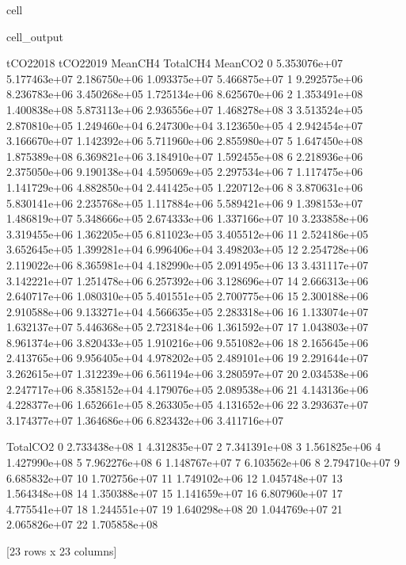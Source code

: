 \documentclass[letterpaper,10pt,english]{jupyterBook}
\begin{document}
\begin{sphinxuseclass}{cell}
\begin{sphinxVerbatimOutput}
\begin{sphinxuseclass}{cell_output}
\begin{sphinxVerbatim}[commandchars=\\\{\}]
       tCO2\PYGZus{}2018     tCO2\PYGZus{}2019      Mean\PYGZus{}CH4     Total\PYGZus{}CH4      Mean\PYGZus{}CO2  \PYGZbs{}
0   5.353076e+07  5.177463e+07  2.186750e+06  1.093375e+07  5.466875e+07   
1   9.292575e+06  8.236783e+06  3.450268e+05  1.725134e+06  8.625670e+06   
2   1.353491e+08  1.400838e+08  5.873113e+06  2.936556e+07  1.468278e+08   
3   3.513524e+05  2.870810e+05  1.249460e+04  6.247300e+04  3.123650e+05   
4   2.942454e+07  3.166670e+07  1.142392e+06  5.711960e+06  2.855980e+07   
5   1.647450e+08  1.875389e+08  6.369821e+06  3.184910e+07  1.592455e+08   
6   2.218936e+06  2.375050e+06  9.190138e+04  4.595069e+05  2.297534e+06   
7   1.117475e+06  1.141729e+06  4.882850e+04  2.441425e+05  1.220712e+06   
8   3.870631e+06  5.830141e+06  2.235768e+05  1.117884e+06  5.589421e+06   
9   1.398153e+07  1.486819e+07  5.348666e+05  2.674333e+06  1.337166e+07   
10  3.233858e+06  3.319455e+06  1.362205e+05  6.811023e+05  3.405512e+06   
11  2.524186e+05  3.652645e+05  1.399281e+04  6.996406e+04  3.498203e+05   
12  2.254728e+06  2.119022e+06  8.365981e+04  4.182990e+05  2.091495e+06   
13  3.431117e+07  3.142221e+07  1.251478e+06  6.257392e+06  3.128696e+07   
14  2.666313e+06  2.640717e+06  1.080310e+05  5.401551e+05  2.700775e+06   
15  2.300188e+06  2.910588e+06  9.133271e+04  4.566635e+05  2.283318e+06   
16  1.133074e+07  1.632137e+07  5.446368e+05  2.723184e+06  1.361592e+07   
17  1.043803e+07  8.961374e+06  3.820433e+05  1.910216e+06  9.551082e+06   
18  2.165645e+06  2.413765e+06  9.956405e+04  4.978202e+05  2.489101e+06   
19  2.291644e+07  3.262615e+07  1.312239e+06  6.561194e+06  3.280597e+07   
20  2.034538e+06  2.247717e+06  8.358152e+04  4.179076e+05  2.089538e+06   
21  4.143136e+06  4.228377e+06  1.652661e+05  8.263305e+05  4.131652e+06   
22  3.293637e+07  3.174377e+07  1.364686e+06  6.823432e+06  3.411716e+07   

       Total\PYGZus{}CO2  
0   2.733438e+08  
1   4.312835e+07  
2   7.341391e+08  
3   1.561825e+06  
4   1.427990e+08  
5   7.962276e+08  
6   1.148767e+07  
7   6.103562e+06  
8   2.794710e+07  
9   6.685832e+07  
10  1.702756e+07  
11  1.749102e+06  
12  1.045748e+07  
13  1.564348e+08  
14  1.350388e+07  
15  1.141659e+07  
16  6.807960e+07  
17  4.775541e+07  
18  1.244551e+07  
19  1.640298e+08  
20  1.044769e+07  
21  2.065826e+07  
22  1.705858e+08  

[23 rows x 23 columns]
\end{sphinxVerbatim}

\end{sphinxuseclass}\end{sphinxVerbatimOutput}

\end{sphinxuseclass}
\end{document}
